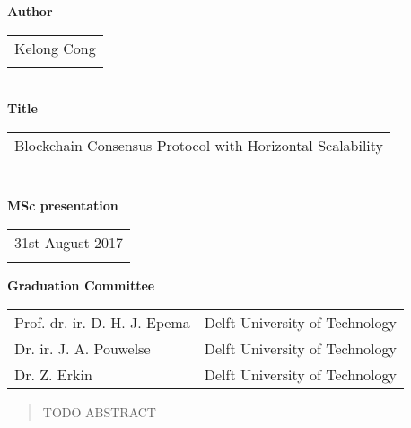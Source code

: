 \thispagestyle{empty}

\noindent \textbf{Author}\\
\begin{tabular}{l}
Kelong Cong\\
\\
\end{tabular}\\
\noindent \textbf{Title}\\
\begin{tabular}{l}
Blockchain Consensus Protocol with Horizontal Scalability\\
\\
\end{tabular}\\
\noindent \textbf{MSc presentation}\\
\begin{tabular}{l}
31st August 2017\\
\\
\end{tabular}

\vspace{1.1cm}

\noindent \textbf{Graduation Committee}\\
\begin{tabular}{ll}
Prof. dr. ir. D. H. J. Epema            & Delft University of Technology \\
Dr. ir. J. A. Pouwelse                  & Delft University of Technology \\
Dr. Z. Erkin                            & Delft University of Technology \\
\end{tabular}

\begin{abstract} %
TODO ABSTRACT
\end{abstract}

\clearpage

